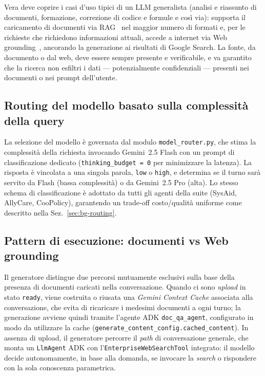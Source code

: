Vera deve coprire i casi d'uso tipici di un LLM generalista (analisi e riassunto di documenti,
formazione, correzione di codice e formule e così via): supporta il caricamento di documenti via
RAG~\cite{lewis2020rag} nel maggior numero di formati e, per le richieste che richiedono
informazioni attuali, accede a internet via Web grounding~\cite{gcp_grounding}, ancorando la
generazione ai risultati di Google Search. La fonte, da documento o dal web, deve essere sempre
presente e verificabile, e va garantito che la ricerca non esfiltri i dati --- potenzialmente
confidenziali --- presenti nei documenti o nei prompt dell'utente.

\subsection{Routing del modello basato sulla complessità della query}
\label{subsec:vera-routing}

La selezione del modello è governata dal modulo \texttt{model\_router.py},
che stima la complessità della richiesta invocando Gemini~2.5 Flash con un
prompt di classificazione dedicato (\texttt{thinking\_budget = 0} per
minimizzare la latenza). La risposta è vincolata a una singola parola,
\texttt{low} o \texttt{high}, e determina se il turno sarà servito da
Flash (bassa complessità) o da Gemini~2.5 Pro (alta). Lo stesso schema di
classificazione è adottato da tutti gli agenti della suite (SysAid,
AllyCare, CooPolicy), garantendo un trade-off costo/qualità uniforme come
descritto nella Sez.~\ref{sec:bg-routing}.

\subsection{Pattern di esecuzione: documenti vs Web grounding}
\label{subsec:vera-paths}

Il generatore distingue due percorsi mutuamente esclusivi sulla base della
presenza di documenti caricati nella conversazione. Quando ci sono \emph{upload}
in stato \texttt{ready}, viene costruita o riusata una \emph{Gemini Context
Cache} associata alla conversazione, che evita di ricaricare i medesimi
documenti a ogni turno; la generazione avviene quindi tramite l'agente ADK
\texttt{doc\_qa\_agent}, configurato in modo da utilizzare la cache
(\texttt{generate\_content\_config.cached\_content}).
In assenza di upload, il generatore percorre il \emph{path} di conversazione
generale, che monta un \texttt{LlmAgent} ADK con
l'\texttt{EnterpriseWebSearchTool} integrato: il modello decide
autonomamente, in base alla domanda, se invocare la \emph{search} o
rispondere con la sola conoscenza parametrica.

